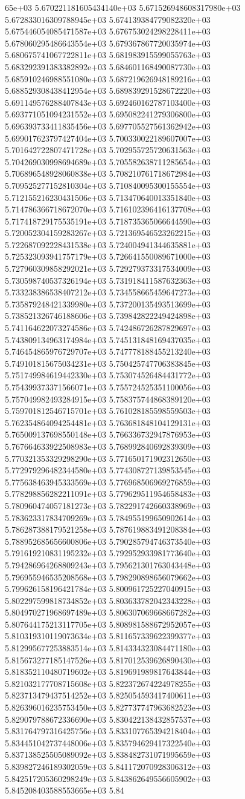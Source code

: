65e+03	5.670221181605434140e+03	5.671526948608317980e+03	5.672833016309788945e+03	5.674139384779082320e+03	5.675446054085471587e+03	5.676753024298228411e+03	5.678060295486643554e+03	5.679367867720035974e+03	5.680675741067722811e+03	5.681983915599055763e+03	5.683292391383382892e+03	5.684601168490087730e+03	5.685910246988551080e+03	5.687219626948189216e+03	5.688529308438412954e+03	5.689839291528672220e+03	5.691149576288407843e+03	5.692460162787103400e+03	5.693771051094231552e+03	5.695082241279306800e+03	5.696393733411835456e+03	5.697705527561362942e+03	5.699017623797427404e+03	5.700330022189607007e+03	5.701642722807471728e+03	5.702955725720631563e+03	5.704269030998694689e+03	5.705582638711285654e+03	5.706896548928060838e+03	5.708210761718672984e+03	5.709525277152810304e+03	5.710840095300155554e+03	5.712155216230431506e+03	5.713470640013351840e+03	5.714786366718672070e+03	5.716102396416137708e+03	5.717418729175535191e+03	5.718735365066644590e+03	5.720052304159283267e+03	5.721369546523262215e+03	5.722687092228431538e+03	5.724004941344635881e+03	5.725323093941757179e+03	5.726641550089671000e+03	5.727960309858292021e+03	5.729279373317534009e+03	5.730598740537326194e+03	5.731918411587632363e+03	5.733238386538407212e+03	5.734558665459647273e+03	5.735879248421339980e+03	5.737200135493513699e+03	5.738521326746188606e+03	5.739842822249424898e+03	5.741164622073274586e+03	5.742486726287829697e+03	5.743809134963174984e+03	5.745131848169437035e+03	5.746454865976729707e+03	5.747778188455213240e+03	5.749101815675034231e+03	5.750425747706383845e+03	5.751749984619442330e+03	5.753074526484431772e+03	5.754399373371566071e+03	5.755724525351100056e+03	5.757049982493284915e+03	5.758375744868389120e+03	5.759701812546715701e+03	5.761028185598559503e+03	5.762354864094254481e+03	5.763681848104129131e+03	5.765009137698550148e+03	5.766336732947876953e+03	5.767664633922508983e+03	5.768992840692839309e+03	5.770321353329298290e+03	5.771650171902312650e+03	5.772979296482344580e+03	5.774308727139853545e+03	5.775638463945333569e+03	5.776968506969276859e+03	5.778298856282211091e+03	5.779629511954658483e+03	5.780960474057181273e+03	5.782291742660338969e+03	5.783623317834709269e+03	5.784955199650902614e+03	5.786287388179521258e+03	5.787619883491208384e+03	5.788952685656600806e+03	5.790285794746373540e+03	5.791619210831195232e+03	5.792952933981773640e+03	5.794286964268809243e+03	5.795621301763043448e+03	5.796955946535208568e+03	5.798290898656079662e+03	5.799626158196421784e+03	5.800961725227040915e+03	5.802297599818734852e+03	5.803633782042343228e+03	5.804970271968697489e+03	5.806307069668667282e+03	5.807644175213117705e+03	5.808981588672952057e+03	5.810319310119073634e+03	5.811657339622399377e+03	5.812995677253883514e+03	5.814334323084471180e+03	5.815673277185147526e+03	5.817012539626890430e+03	5.818352110480719602e+03	5.819691989817643844e+03	5.821032177708715608e+03	5.822372674224978255e+03	5.823713479437514252e+03	5.825054593417400611e+03	5.826396016235753450e+03	5.827737747963682523e+03	5.829079788672336690e+03	5.830422138432857537e+03	5.831764797316425756e+03	5.833107765394218404e+03	5.834451042737448006e+03	5.835794629417322540e+03	5.837138525505089092e+03	5.838482731071995659e+03	5.839827246189302059e+03	5.841172070928306312e+03	5.842517205360298249e+03	5.843862649556605902e+03	5.845208403588553665e+03	5.84